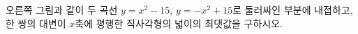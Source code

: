 \noindent\begin{minipage}[t]{0.58\linewidth}\vspace{0pt}\raggedright 오른쪽 그림과 같이 두 곡선 $y=x^2-15$, $y=-x^2+15$로 둘러싸인 부분에 내접하고, 한 쌍의 대변이 $x$축에 평행한 직사각형의 넓이의 최댓값을 구하시오.\end{minipage}\hfill\begin{minipage}[t]{0.4\linewidth}\vspace{0pt}\centering \resizebox{\ifdim\width>\linewidth\linewidth\else\width\fi}{!}{}\end{minipage}\par

